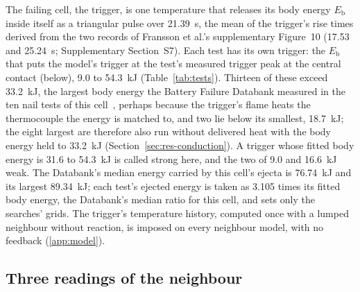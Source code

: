 \documentclass[preprint,12pt]{elsarticle}
\begin{document}
The failing cell, the trigger, is one temperature that releases its body energy $E_\mathrm{b}$ inside itself as a triangular pulse over 21.39~s, the mean of the trigger's rise times derived from the two records of Fransson et al.'s supplementary Figure~10 (17.53 and 25.24~s; Supplementary Section~S7). Each test has its own trigger: the $E_\mathrm{b}$ that puts the model's trigger at the test's measured trigger peak at the central contact (below), 9.0 to 54.3~kJ (Table~\ref{tab:tests}). Thirteen of these exceed 33.2~kJ, the largest body energy the Battery Failure Databank measured in the ten nail tests of this cell~\cite{finegan2024databank}, perhaps because the trigger's flame heats the thermocouple the energy is matched to, and two lie below its smallest, 18.7~kJ; the eight largest are therefore also run without delivered heat with the body energy held to 33.2~kJ (Section~\ref{sec:res-conduction}). A trigger whose fitted body energy is 31.6 to 54.3~kJ is called strong here, and the two of 9.0 and 16.6~kJ weak. The Databank's median energy carried by this cell's ejecta is 76.74~kJ and its largest 89.34~kJ; each test's ejected energy is taken as 3.105 times its fitted body energy, the Databank's median ratio for this cell, and sets only the searches' grids. The trigger's temperature history, computed once with a lumped neighbour without reaction, is imposed on every neighbour model, with no feedback (\ref{app:model}).

\subsection{Three readings of the neighbour}
\label{sec:neighbour}
\end{document}
